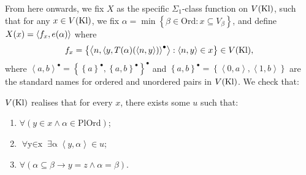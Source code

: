 \documentclass[12pt,openany]{book}
\theoremstyle{plain}
\theoremstyle{definition}
\newcommand\uplabel[1]{\textup{(#1)}}
\newcommand\tuple[1]{\left\langle #1 \right\rangle}
\newcommand\opA[1]{\mathop{\forall #1}}
\newcommand\opE[1]{\mathop{\exists #1}}
\newcommand\Ord{\mathrm{Ord}}
\newcommand\PlOrd{\mathrm{PlOrd}}
\newcommand\Kl{\mathrm{Kl}}
\begin{document}
From here onwards, we fix $X$ as the specific $\Sigma_1$-class function on $V\mleft(\Kl\mright)$, such that for any $x \in V\mleft(\Kl\mright)$, we fix $\alpha = \min \left\{\beta \in \Ord : x \subseteq V_\beta\right\}$, and define $X\mleft(x\mright) = \tuple{f_x, e\mleft(\alpha\mright)}$ where
\[f_x = \left\{\tuple{n, \tuple{y, T\mleft(\alpha\mright)\mleft(\tuple{n, y}\mright)}^\bullet} : \tuple{n, y} \in x\right\} \in V\mleft(\Kl\mright),\]
where $\tuple{a, b}^\bullet = \left\{\left\{a\right\}^\bullet, \left\{a, b\right\}^\bullet\right\}^\bullet$ and $\left\{a, b\right\}^\bullet = \left\{\tuple{0, a}, \tuple{1, b}\right\}$ are the standard names for ordered and unordered pairs in $V\mleft(\Kl\mright)$. We check that:
\begin{lemma}
  \label{lem:kpp-incomp-relation-in-vkl}
  $V\mleft(\Kl\mright)$ realises that for every $x$, there exists some $u$ such that:
  \begin{enumerate}[label=\uplabel{\roman*}]
    \item \label{itm:kpp-real-internal-incom-prop-pl} $\opA{{\tuple{y, \alpha} \in u}} \left(y \in x \land \alpha \in \PlOrd\right)$;
    \item \label{itm:kpp-real-internal-incom-prop-surj} $\opA{y \in x} \opE{\alpha} \tuple{y, \alpha} \in u$;
    \item \label{itm:kpp-real-internal-incom-prop-incom} $\opA{{\tuple{y, \alpha}, \tuple{z, \beta} \in u}} \left(\alpha \subseteq \beta \rightarrow y = z \land \alpha = \beta\right)$.
  \end{enumerate}
\end{lemma}
\end{document}
